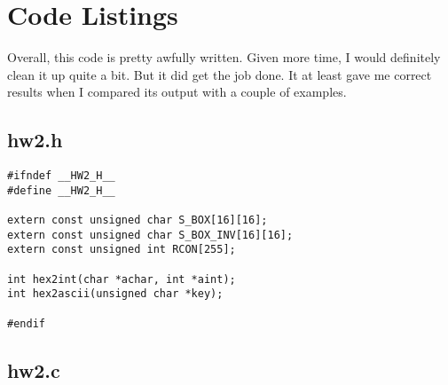 \documentclass[a4paper]{report}
\begin{document}
\section{Code Listings}

Overall, this code is pretty awfully written. Given more time, I would definitely clean it up quite a bit.
But it did get the job done. It at least gave me correct results when I compared its output with a couple of
examples.

\subsection{hw2.h}

\begin{lstlisting}
#ifndef __HW2_H__
#define __HW2_H__

extern const unsigned char S_BOX[16][16];
extern const unsigned char S_BOX_INV[16][16];
extern const unsigned int RCON[255];

int hex2int(char *achar, int *aint);
int hex2ascii(unsigned char *key);

#endif
\end{lstlisting}

\subsection{hw2.c}
\end{document}
